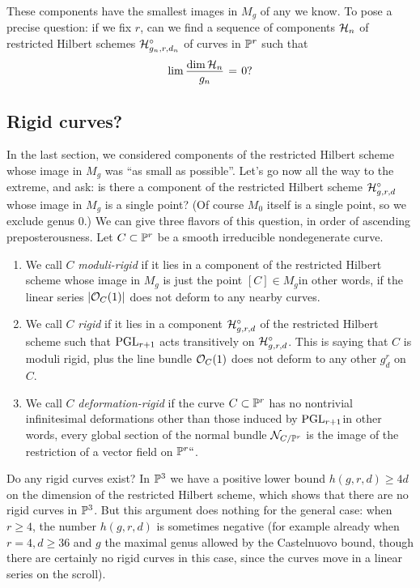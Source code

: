 These components have the smallest images in $M_{g}$ of any we know. To
pose a precise question: if we fix $r$, can we find a sequence of
components $\mathcal H_n$ of  restricted Hilbert schemes  $\mathcal H^\circ_{g_n,r,d_n}$
of curves in ${\mathbb P}^r$ such that
$$
\lim \frac{\dim \cH_n}{g_n} \; = \; 0?
$$

\subsection*{Rigid curves?}
\label{rigid?} %

In the last section, we considered components of the restricted Hilbert
scheme whose image in $M_g$ was ``as small as possible''. Let's go now all
the way to the extreme, and ask: is there a component of the restricted
Hilbert scheme $\mathcal H^\circ_{g,r,d}$ whose image in $M_g$ is a single
%
point? (Of course $M_0$ itself is a single point, so we exclude genus
0.) We can give three flavors of this question, in order of ascending
preposterousness. Let $C \subset {\mathbb P}^r$ be
a smooth irreducible nondegenerate curve.

\begin{enumerate}
\item We call $C$ \emph{moduli-rigid} if it lies in a component of the
%
restricted Hilbert scheme whose image in $M_g$ is just the point $[C]
\in M_g$\emdash in other words, if the linear series $|{\mathcal O}_C(1)|$ does not
deform to any nearby curves.

\item We call $C$ \emph{rigid} if it lies in a component
%
$\mathcal H^\circ_{g,r,d}$ of the restricted Hilbert scheme such that $\operatorname{PGL}_{r+1}$
acts transitively on $\mathcal H^\circ_{g,r,d}$. This is saying that $C$ is
moduli rigid, plus the line bundle ${\mathcal O}_C(1)$ does not deform to any
other $g^r_d$ on $C$.

\item We call $C$ \emph{deformation-rigid} if the curve $C \subset {\mathbb P}^r$
%
has no nontrivial infinitesimal deformations other than those induced
by $\operatorname{PGL}_{r+1}$\emdash in other words, every global section of the normal
bundle ${\mathcal N}_{C/{\mathbb P}^r}$ is the image of the restriction of a vector field
on ${\mathbb P}^r` `$.
\end{enumerate}

Do any rigid curves exist? In ${\mathbb P}^{3}$ we have a positive lower bound
$h(g,r,d)\geq 4d$
on the dimension of the restricted Hilbert scheme, which shows that
there are no rigid
curves in ${\mathbb P}^{3}$. But this argument does nothing for the general case:
when $r \geq 4$, the number $h(g,r,d)$ is sometimes negative
(for example already when $r = 4, d\geq 36$ and $g$ the maximal genus
allowed by
the Castelnuovo bound, though there are certainly no rigid curves in
this case,
since the curves move in a linear series on the scroll).

